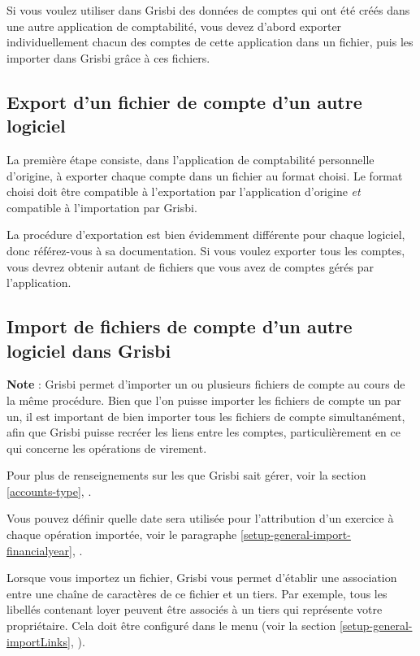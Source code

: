 Si vous voulez utiliser dans Grisbi des données de comptes qui ont été créés
dans une autre application de comptabilité, vous devez d'abord exporter individuellement chacun des comptes de cette application dans un fichier, puis les importer dans Grisbi grâce à ces fichiers.


\subsection{Export d'un fichier de compte d'un autre logiciel\label{move-import-exportinit}}

La première étape consiste, dans l'application de comptabilité personnelle
d'origine, à exporter chaque compte dans un fichier au format choisi. Le format choisi doit être compatible à l'exportation par l'application d'origine \emph{et} compatible à l'importation par Grisbi.

La procédure d'exportation est bien évidemment différente pour chaque logiciel, donc référez-vous à sa documentation. Si vous voulez exporter tous les comptes, vous devrez obtenir autant de fichiers que vous avez de comptes gérés par l'application.


\subsection{Import de fichiers de compte d'un autre logiciel dans Grisbi\label{move-import-importinit}}

\textbf{Note} : Grisbi permet d'importer un ou plusieurs fichiers de compte au cours de la même procédure. Bien que l'on puisse importer les fichiers de compte un par un, il est important de bien importer tous les fichiers de compte simultanément, afin que Grisbi puisse recréer les liens entre les comptes, particulièrement en ce qui concerne les opérations de virement.

Pour plus de renseignements sur les  que Grisbi sait gérer,  voir la section \vref{accounts-type}, .

Vous pouvez définir quelle date sera utilisée pour l'attribution d'un exercice à 
chaque opération importée, voir le paragraphe \vref{setup-general-import-financialyear}, .

Lorsque vous importez un fichier, Grisbi vous permet d'établir une association entre une chaîne de caractères de ce fichier et un tiers. Par exemple, tous les libellés contenant \og loyer \fg{} peuvent être associés à un tiers qui représente votre propriétaire. Cela doit être configuré dans le menu  (voir la section \vref{setup-general-importLinks}, ).

